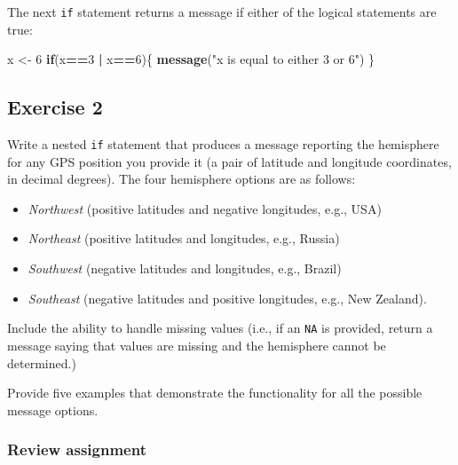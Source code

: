 \documentclass[
]{book}
\newenvironment{Shaded}{\begin{snugshade}}{\end{snugshade}}
\newcommand{\ControlFlowTok}[1]{\textcolor[rgb]{0.13,0.29,0.53}{\textbf{#1}}}
\newcommand{\DecValTok}[1]{\textcolor[rgb]{0.00,0.00,0.81}{#1}}
\newcommand{\KeywordTok}[1]{\textcolor[rgb]{0.13,0.29,0.53}{\textbf{#1}}}
\newcommand{\NormalTok}[1]{#1}
\newcommand{\OperatorTok}[1]{\textcolor[rgb]{0.81,0.36,0.00}{\textbf{#1}}}
\newcommand{\StringTok}[1]{\textcolor[rgb]{0.31,0.60,0.02}{#1}}
\providecommand{\tightlist}{%
  \setlength{\itemsep}{0pt}\setlength{\parskip}{0pt}}
\begin{document}
The next \texttt{if} statement returns a message if either of the logical statements are true:

\begin{Shaded}
\begin{Highlighting}[]
\NormalTok{x <-}\StringTok{ }\DecValTok{6}
\ControlFlowTok{if}\NormalTok{(x}\OperatorTok{==}\DecValTok{3} \OperatorTok{|}\StringTok{ }\NormalTok{x}\OperatorTok{==}\DecValTok{6}\NormalTok{)\{}
  \KeywordTok{message}\NormalTok{(}\StringTok{"x is equal to either 3 or 6"}\NormalTok{)}
\NormalTok{\}}
\end{Highlighting}
\end{Shaded}

\hypertarget{exercise-2-7}{%
\subsection*{Exercise 2}\label{exercise-2-7}}

Write a nested \texttt{if} statement that produces a message reporting the hemisphere for any GPS position you provide it (a pair of latitude and longitude coordinates, in decimal degrees). The four hemisphere options are as follows:

\begin{itemize}
\tightlist
\item
  \emph{Northwest} (positive latitudes and negative longitudes, e.g., USA)\\
\item
  \emph{Northeast} (positive latitudes and longitudes, e.g., Russia)
\item
  \emph{Southwest} (negative latitudes and longitudes, e.g., Brazil)\\
\item
  \emph{Southeast} (negative latitudes and positive longitudes, e.g., New Zealand).
\end{itemize}

Include the ability to handle missing values (i.e., if an \texttt{NA} is provided, return a message saying that values are missing and the hemisphere cannot be determined.)

Provide five examples that demonstrate the functionality for all the possible message options.

\hypertarget{review-assignment-8}{%
\subsubsection*{Review assignment}\label{review-assignment-8}}
\end{document}
